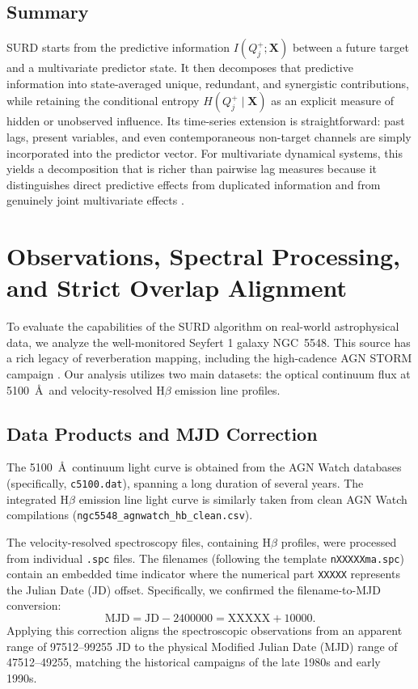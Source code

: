 \documentclass[12pt, a4paper]{article}
\begin{document}
\subsection{Summary}

SURD starts from the predictive information \(I(Q_j^+;\mathbf{X})\) between a future target and a multivariate predictor state. It then decomposes that predictive information into state-averaged unique, redundant, and synergistic contributions, while retaining the conditional entropy \(H(Q_j^+\mid \mathbf{X})\) as an explicit measure of hidden or unobserved influence. Its time-series extension is straightforward: past lags, present variables, and even contemporaneous non-target channels are simply incorporated into the predictor vector. For multivariate dynamical systems, this yields a decomposition that is richer than pairwise lag measures because it distinguishes direct predictive effects from duplicated information and from genuinely joint multivariate effects \cite{MartinezSanchez2024SURD,WilliamsBeer2010}.

\section{Observations, Spectral Processing, and Strict Overlap Alignment}
\label{sec:data_processing}

To evaluate the capabilities of the SURD algorithm on real-world astrophysical data, we analyze the well-monitored Seyfert 1 galaxy NGC~5548. This source has a rich legacy of reverberation mapping, including the high-cadence AGN STORM campaign \cite{DeRosa2015,Pei2017}. Our analysis utilizes two main datasets: the optical continuum flux at 5100~\AA\ and velocity-resolved H\(\beta\) emission line profiles.

\subsection{Data Products and MJD Correction}

The 5100~\AA\ continuum light curve is obtained from the AGN Watch databases (specifically, \texttt{c5100.dat}), spanning a long duration of several years. The integrated H\(\beta\) emission line light curve is similarly taken from clean AGN Watch compilations (\texttt{ngc5548_agnwatch_hb_clean.csv}).

The velocity-resolved spectroscopy files, containing H\(\beta\) profiles, were processed from individual \texttt{.spc} files. The filenames (following the template \texttt{nXXXXXma.spc}) contain an embedded time indicator where the numerical part \texttt{XXXXX} represents the Julian Date (JD) offset. Specifically, we confirmed the filename-to-MJD conversion:
\begin{equation}
\mathrm{MJD} = \mathrm{JD} - 2400000 = \mathrm{XXXXX} + 10000.
\end{equation}
Applying this correction aligns the spectroscopic observations from an apparent range of 97512--99255 JD to the physical Modified Julian Date (MJD) range of 47512--49255, matching the historical campaigns of the late 1980s and early 1990s.
\end{document}
